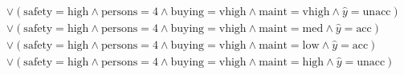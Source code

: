\begin{scriptsize}
\[\begin{aligned}
  \\ & \lor (\text{safety}=\text{high} \land \text{persons}=\text{4} \land \text{buying}=\text{vhigh} \land \text{maint}=\text{vhigh} \land \hat{y}=\text{unacc})
  \\ & \lor (\text{safety}=\text{high} \land \text{persons}=\text{4} \land \text{buying}=\text{vhigh} \land \text{maint}=\text{med} \land \hat{y}=\text{acc})
  \\ & \lor (\text{safety}=\text{high} \land \text{persons}=\text{4} \land \text{buying}=\text{vhigh} \land \text{maint}=\text{low} \land \hat{y}=\text{acc})
  \\ & \lor (\text{safety}=\text{high} \land \text{persons}=\text{4} \land \text{buying}=\text{vhigh} \land \text{maint}=\text{high} \land \hat{y}=\text{unacc})
\end{aligned}
\]
\end{scriptsize}
